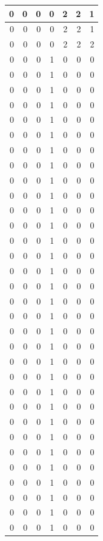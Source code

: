 \documentclass[
  12pt,
]{krantz}
\begin{document}
\begin{tabular}{r|r|r|r|r|r|r}
\hline
0 & 0 & 0 & 0 & 2 & 2 & 1\\
\hline
0 & 0 & 0 & 0 & 2 & 2 & 1\\
\hline
0 & 0 & 0 & 0 & 2 & 2 & 2\\
\hline
0 & 0 & 0 & 1 & 0 & 0 & 0\\
\hline
0 & 0 & 0 & 1 & 0 & 0 & 0\\
\hline
0 & 0 & 0 & 1 & 0 & 0 & 0\\
\hline
0 & 0 & 0 & 1 & 0 & 0 & 0\\
\hline
0 & 0 & 0 & 1 & 0 & 0 & 0\\
\hline
0 & 0 & 0 & 1 & 0 & 0 & 0\\
\hline
0 & 0 & 0 & 1 & 0 & 0 & 0\\
\hline
0 & 0 & 0 & 1 & 0 & 0 & 0\\
\hline
0 & 0 & 0 & 1 & 0 & 0 & 0\\
\hline
0 & 0 & 0 & 1 & 0 & 0 & 0\\
\hline
0 & 0 & 0 & 1 & 0 & 0 & 0\\
\hline
0 & 0 & 0 & 1 & 0 & 0 & 0\\
\hline
0 & 0 & 0 & 1 & 0 & 0 & 0\\
\hline
0 & 0 & 0 & 1 & 0 & 0 & 0\\
\hline
0 & 0 & 0 & 1 & 0 & 0 & 0\\
\hline
0 & 0 & 0 & 1 & 0 & 0 & 0\\
\hline
0 & 0 & 0 & 1 & 0 & 0 & 0\\
\hline
0 & 0 & 0 & 1 & 0 & 0 & 0\\
\hline
0 & 0 & 0 & 1 & 0 & 0 & 0\\
\hline
0 & 0 & 0 & 1 & 0 & 0 & 0\\
\hline
0 & 0 & 0 & 1 & 0 & 0 & 0\\
\hline
0 & 0 & 0 & 1 & 0 & 0 & 0\\
\hline
0 & 0 & 0 & 1 & 0 & 0 & 0\\
\hline
0 & 0 & 0 & 1 & 0 & 0 & 0\\
\hline
0 & 0 & 0 & 1 & 0 & 0 & 0\\
\hline
0 & 0 & 0 & 1 & 0 & 0 & 0\\
\hline
0 & 0 & 0 & 1 & 0 & 0 & 0\\
\hline
0 & 0 & 0 & 1 & 0 & 0 & 0\\
\hline
0 & 0 & 0 & 1 & 0 & 0 & 0\\
\hline
0 & 0 & 0 & 1 & 0 & 0 & 0\\
\hline
0 & 0 & 0 & 1 & 0 & 0 & 0\\
\hline
0 & 0 & 0 & 1 & 0 & 0 & 0\\

\end{tabular}
\end{document}
